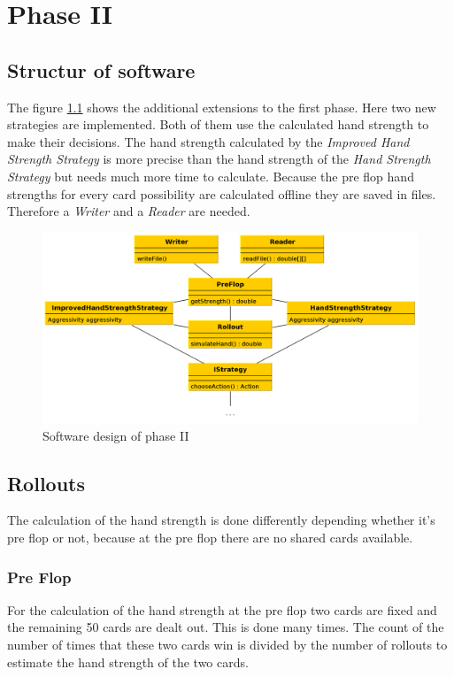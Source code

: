 \chapter{Phase II}

\section{Structur of software}
The figure \ref{fig:phase2} shows the additional extensions to the first phase. Here two new strategies are implemented. Both of them use the calculated hand strength to make their decisions. The hand strength calculated by the \emph{Improved Hand Strength Strategy} is more precise than the hand strength of the \emph{Hand Strength Strategy} but needs much more time to calculate. Because the pre flop hand strengths for every card possibility are calculated offline they are saved in files. Therefore a \emph{Writer} and a \emph{Reader} are needed.

\begin{figure}[h]
  \centering
  \includegraphics[width=1.0\textwidth]{images/phase2}
  \caption{Software design of phase II}
  \label{fig:phase2}
\end{figure}

\section{Rollouts}
The calculation of the hand strength is done differently depending whether it's pre flop or not, because at the pre flop there are no shared cards available.

\subsection{Pre Flop}
For the calculation of the hand strength at the pre flop two cards are fixed and the remaining 50 cards are dealt out. This is done many times. The count of the number of times that these two cards win is divided by the number of rollouts to estimate the hand strength of the two cards. 

